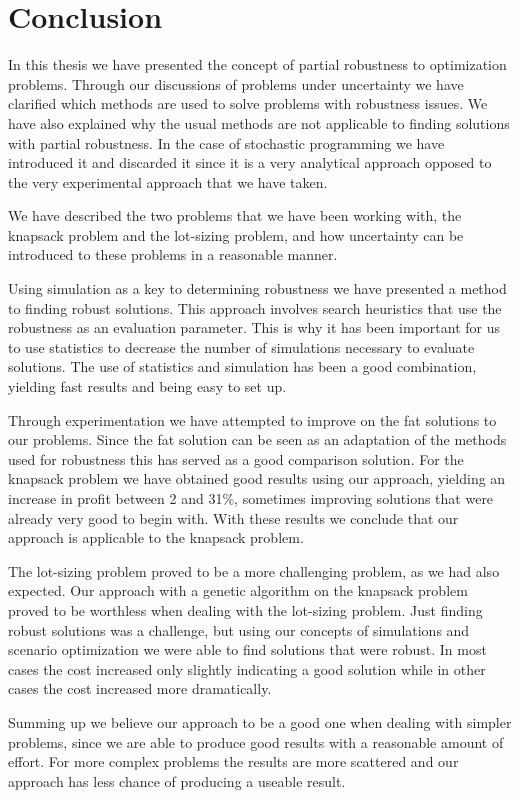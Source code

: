 \chapter{Conclusion}
\label{sec:conclusion}
In this thesis we have presented the concept of partial robustness to
optimization problems. Through our discussions of problems under
uncertainty we have clarified which methods are used to solve problems
with robustness issues. We have also explained why the usual methods
are not applicable to finding solutions with partial robustness. In
the case of stochastic programming we have introduced it and discarded
it since it is a very analytical approach opposed to the very
experimental approach that we have taken.

We have described the two problems that we have been working with, the
knapsack problem and the lot-sizing problem, and how uncertainty can
be introduced to these problems in a reasonable manner.

Using simulation as a key to determining robustness we have presented
a method to finding robust solutions. This approach involves search
heuristics that use the robustness as an evaluation parameter. This is
why it has been important for us to use statistics to decrease the
number of simulations necessary to evaluate solutions. The use of
statistics and simulation has been a good combination, yielding fast
results and being easy to set up.

Through experimentation we have attempted to improve on the fat
solutions to our problems. Since the fat solution can be seen as an
adaptation of the methods used for robustness this has served as a
good comparison solution. For the knapsack problem we have obtained
good results using our approach, yielding an increase in profit
between 2 and 31$\%$, sometimes improving solutions that were already
very good to begin with. With these results we conclude that our
approach is applicable to the knapsack problem.

The lot-sizing problem proved to be a more challenging problem, as we
had also expected. Our approach with a genetic algorithm on the
knapsack problem proved to be worthless when dealing with the
lot-sizing problem. Just finding robust solutions was a challenge, but
using our concepts of simulations and scenario optimization we were
able to find solutions that were robust. In most cases the cost
increased only slightly indicating a good solution while in other
cases the cost increased more dramatically.

Summing up we believe our approach to be a good one when dealing with
simpler problems, since we are able to produce good results with a
reasonable amount of effort. For more complex problems the results are
more scattered and our approach has less chance of producing a useable
result.